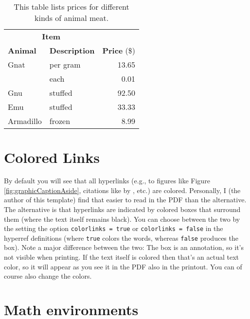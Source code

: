 \begin{table}[h!] %
  \begin{tabular}{llr}
    \toprule
    \multicolumn{2}{c}{\textbf{Item}} \\
    \cmidrule(r){1-2}
    \textbf{Animal} & \textbf{Description} & \textbf{Price} (\$)\\
    \midrule
    Gnat            & per gram             & 13.65      \\
                    & each                 & 0.01       \\
    Gnu             & stuffed              & 92.50      \\
    Emu             & stuffed              & 33.33      \\
    Armadillo       & frozen               & 8.99       \\
    \bottomrule
  \end{tabular}
  \caption{This table lists prices for different kinds of animal meat.\label{tab:meatPrices}}
\end{table}




\section{Colored Links}

By default you will see that all hyperlinks (e.g., to figures like Figure \ref{fig:graphicCaptionAside}, citations like by \cite{Smith2021Wubalubadubdub}, etc.) are colored. Personally, I (the author of this template) find that easier to read in the PDF than the alternative. The alternative is that hyperlinks are indicated by colored boxes that surround them (where the text itself remains black). You can choose between the two by the setting the option \verb!colorlinks = true! or \verb!colorlinks = false! in the hyperref definitions (where \verb!true! colors the words, whereas \verb!false! produces the box). Note a major difference between the two: The box is an annotation, so it's not visible when printing. If the text itself is colored then that's an actual text color, so it will appear as you see it in the PDF also in the printout. You can of course also change the colors.




\section{Math environments}

